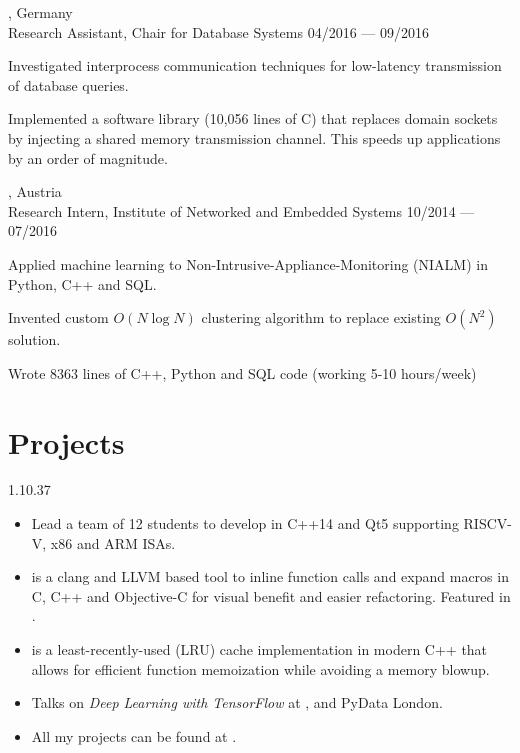 \begin{entry}
  {, Germany}
	{\\Research Assistant, Chair for Database Systems}
	{04/2016 --- 09/2016}

  \item Investigated interprocess communication techniques for low-latency transmission of database queries.
  \item Implemented a software library (10,056 lines of C) that replaces domain sockets by injecting a shared memory transmission channel. This speeds up applications by an order of magnitude.
\end{entry}

\begin{entry}
  {, Austria}
	{\\Research Intern, Institute of Networked and Embedded Systems}
	{10/2014 --- 07/2016}

  \item Applied machine learning to Non-Intrusive-Appliance-Monitoring (NIALM) in Python, C++ and SQL.
	\item Invented custom $O(N \log N)$ clustering algorithm to replace existing $O(N^2)$ solution.
	\item Wrote 8363 lines of C++, Python and SQL code (working 5-10 hours/week)
\end{entry}
\vspace{-1mm}

\section{Projects}{1.1}{0.37}
\vspace{-4mm}
\begin{itemize}
  \item Lead a team of 12 students to develop  in C++14 and Qt5 supporting RISCV-V, x86 and ARM ISAs.
  \item {} is a clang and LLVM based tool to inline function calls and expand macros in C, C++ and Objective-C for visual benefit and easier refactoring. Featured in .
  \item {} is a least-recently-used (LRU) cache implementation in modern C++ that allows for efficient function memoization while avoiding a memory blowup.
  \item Talks on \emph{Deep Learning with TensorFlow} at ,  and PyData London.
  \item All my projects can be found at
	.
\end{itemize}

